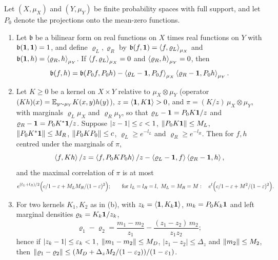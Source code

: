 \begin{lemma}[Recentering]\label{lem:recentering}
Let $(X,\mu_X)$ and $(Y,\mu_Y)$ be finite probability spaces with full support,
and let $P_0$ denote the projections onto the mean-zero functions.
\begin{enumerate}[label=\textup{(\alph*)}]
\item Let $\mathfrak b$ be a bilinear form on real functions on $X$ times real
  functions on $Y$ with $\mathfrak b(\mathbf 1,\mathbf 1)=1$, and define $\varrho_L,\varrho_R$ by
  $\mathfrak b(f,\mathbf 1)=\left\langle f,\varrho_L\right\rangle_{\mu_X}$ and $\mathfrak
  b(\mathbf 1,h)=\left\langle \varrho_R,h\right\rangle_{\mu_Y}$. If $\left\langle f,\varrho_L\right\rangle_{\mu_X}=0$ and
  $\left\langle \varrho_R,h\right\rangle_{\mu_Y}=0$, then
  \[
    \mathfrak b(f,h)=\mathfrak b(P_0f,P_0h)-\left\langle \varrho_L-\mathbf 1,P_0f\right\rangle_{\mu_X}
    \left\langle \varrho_R-\mathbf 1,P_0h\right\rangle_{\mu_Y}.
  \]
\item Let $K\ge0$ be a kernel on $X\times Y$ relative to $\mu_X\otimes\mu_Y$
  (operator $(Kh)(x)=\mathbb E_{y\sim\mu_Y}K(x,y)h(y)$), $z=\left\langle \mathbf 1,K\mathbf 1\right\rangle>0$, and
  $\pi=(K/z)\,\mu_X\otimes\mu_Y$, with marginals $\varrho_L\mu_X$ and
  $\varrho_R\mu_Y$, so that $\varrho_L-\mathbf 1=P_0K\mathbf 1/z$ and
  $\varrho_R-\mathbf 1=P_0K^*\mathbf 1/z$. Suppose $|z-1|\le\varepsilon<1$,
  $\left\|P_0K\mathbf 1\right\|\le M_L$, $\left\|P_0K^*\mathbf 1\right\|\le M_R$, $\left\|P_0KP_0\right\|\le c$,
  $\varrho_L\ge e^{-l_L}$ and $\varrho_R\ge e^{-l_R}$. Then for $f,h$ centred
  under the marginals of $\pi$,
  \[
    \left\langle f,Kh\right\rangle/z=\left\langle f,P_0KP_0h\right\rangle/z-\left\langle \varrho_L-\mathbf 1,f\right\rangle\left\langle \varrho_R-\mathbf 1,h\right\rangle,
  \]
  and the maximal correlation of $\pi$ is at most
  \[
    e^{(l_L+l_R)/2}\Big(c/1-\varepsilon+M_LM_R/(1-\varepsilon)^2\Big);\qquad
    \text{for }l_L=l_R=l,\ M_L=M_R=M:\quad e^l\Big(c/1-\varepsilon+M^2/(1-\varepsilon)^2\Big).
  \]
\item For two kernels $K_1,K_2$ as in (b), with $z_k=\left\langle \mathbf 1,K_k\mathbf 1\right\rangle$,
  $m_k=P_0K_k\mathbf 1$ and left marginal densities $\varrho_k=K_k\mathbf 1/z_k$,
  \[
    \varrho_1-\varrho_2=\frac{m_1-m_2}{z_1}-\frac{(z_1-z_2)\,m_2}{z_1z_2};
  \]
  hence if $|z_k-1|\le\varepsilon_k<1$, $\left\|m_1-m_2\right\|\le M_D$, $|z_1-z_2|\le\Delta_z$
  and $\left\|m_2\right\|\le M_2$, then $\left\|\varrho_1-\varrho_2\right\|\le
  (M_D+\Delta_zM_2/(1-\varepsilon_2))/(1-\varepsilon_1)$.
\end{enumerate}
\end{lemma}


